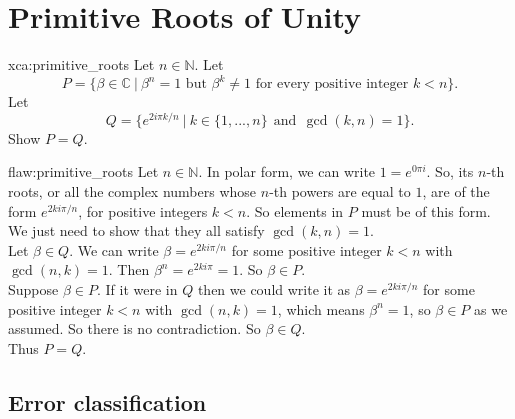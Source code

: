 \section{Primitive Roots of Unity}

\begin{xca}{xca:primitive_roots}
Let $n \in \mathbb{N}$. Let
$$P = \{\beta \in \mathbb{C} \: | \: \text{$\beta^n = 1$ but $\beta^k \neq 1$ for every positive integer $k < n$}\}. $$
Let  $$Q =\{e^{2i\pi k/n} \: | \: k \in \{1,...,n\} \:\: \text{and} \:\: \gcd(k,n) = 1\}. $$
Show $P = Q$.

\end{xca}

\begin{flaw}{flaw:primitive_roots} %
Let $n \in \mathbb{N}$. In polar form, we can write $1 = e^{0\pi i}$. So, its $n$-th roots, or all the complex numbers whose $n$-th powers are equal to $1$, are of the form $e^{2ki\pi/n}$, for positive integers $k < n$. So elements in $P$ must be of this form. We just need to show that they all satisfy $\gcd(k,n) = 1$.  \\

\noindent Let $\beta \in Q$. We can write $\beta = e^{2ki\pi/n}$ for some positive integer $k < n$ with $\gcd(n,k) = 1$. Then $\beta^n = e^{2ki\pi} = 1$. So $\beta \in P$.\\

\noindent Suppose $\beta \in P$. If it were in $Q$ then we could write it as $\beta = e^{2ki\pi/n}$ for some positive integer $k < n$ with $\gcd(n,k) = 1$, which means $\beta^n = 1$, so $\beta \in P$ as we assumed. So there is no contradiction. So $\beta \in Q$. \\

\noindent Thus $P=Q$.
\end{flaw}

\clearpage
\subsection{Error classification}


